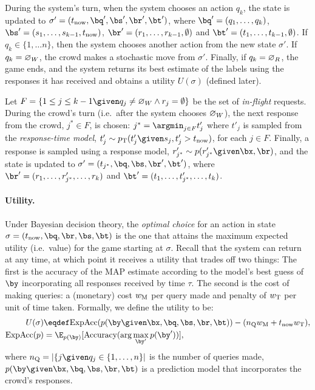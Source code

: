 During the system's turn,
when the system chooses an action $q_k$,
the state is updated to $\sigma' = (\now, \bq', \bs', \br', \bt')$, where $\bq' = (q_1, \ldots, q_k)$, $\bs' = (s_1, \ldots, s_{k-1}, \now)$, $\br' = (r_1, \ldots, r_{k-1}, \emptyset)$ and $\bt' = (t_1, \ldots, t_{k-1}, \emptyset)$.
If $q_k \in \{1, \ldots n\}$, then the system chooses another action from the new state $\sigma'$.
If $q_k = \varnothing_{W}$, the crowd makes a stochastic move from $\sigma'$.
Finally, if $q_k = \varnothing_{R}$, the game ends, and the system returns its best estimate of the labels using the responses it has received and
obtains a utility $U(\sigma)$ (defined later).

Let $F = \{1 \le j \le k-1 \given q_j \neq \acwait \wedge r_j = \emptyset \}$ be the set of \emph{in-flight} requests.
During the crowd's turn (i.e.\ after the system chooses $\varnothing_{W}$), the next response from the crowd, $j^* \in F$, is chosen: $j^* = \argmin_{j \in F} t'_j$ where $t'_j$ is sampled from the \emph{response-time model}, $t'_j \sim \ptime(t'_j \given s_j, t'_j > \now)$, for each $j \in F$. Finally, a response is sampled using a response model, $r'_{j^*} \sim p(r'_{j^*} \given \bx, \br)$, and the state is updated to $\sigma' = (t_{j^*}, \bq, \bs, \br', \bt')$, where $\br' = (r_1, \ldots, r'_{j^*}, \ldots, r_k)$ and $\bt' = (t_1, \ldots, t'_{j^*}, \ldots, t_k)$.

\paragraph{Utility.}
Under Bayesian decision theory, the \emph{optimal choice} for an action in state $\sigma = (\now, \bq, \br, \bs, \bt)$ is the one that attains the maximum expected utility (i.e.\ value) for the game starting at $\sigma$.
Recall that the system can return at any time, at which point it receives a utility
that trades off two things:
The first is the accuracy of the MAP estimate according to the model's best guess of $\by$ incorporating all responses received by time $\tau$.
The second is the cost of making queries: a (monetary) cost $w_\text{M}$ per query made and penalty of $w_\text{T}$ per unit of time taken.
Formally, we define the utility to be:
\begin{align}
  \label{eqn:otj:utility}
  U(\sigma) &\eqdef \text{ExpAcc}(p(\by \given \bx, \bq, \bs, \br, \bt)) - (n_\text{Q} \weightmoney + \now \weighttime), \\
  \text{ExpAcc}(p) &= \E_{p(\by)}[\text{Accuracy}(\arg\max_{\by'} p(\by'))],
\end{align}
where $n_\text{Q} = |\{j \given q_j \in \{1, \ldots, n\}|$ is the number of queries made,
$p(\by \given \bx, \bq, \bs, \br, \bt)$ is a prediction model that incorporates the crowd's responses.

